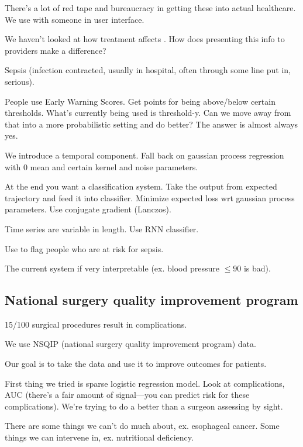 
There's a lot of red tape and bureaucracy in getting these into actual healthcare. We use with someone in user interface.

We haven't looked at how treatment affects . How does presenting this info to providers make a difference?

Sepsis (infection contracted, usually in hospital, often through some line put in, serious).

People use Early Warning Scores. Get points for being above/below certain thresholds. What's currently being used is threshold-y. Can we move away from that into a more probabilistic setting and do better? The answer is almost always yes.

We introduce a temporal component. Fall back on gaussian process regression with 0 mean and certain kernel and noise parameters.

At the end you want a classification system. Take the output from expected trajectory and feed it into classifier. Minimize expected loss wrt gaussian process parameters. 
Use conjugate gradient (Lanczos).

Time series are variable in length. Use RNN classifier.

Use to flag people who are at risk for sepsis.

The current system if very interpretable (ex. blood pressure $\le90$ is bad).

\subsection{National surgery quality improvement program}


15/100 surgical procedures result in complications.  

We use NSQIP (national surgery quality improvement program) data.

Our goal is to take the data and use it to improve outcomes for patients. 

First thing we tried is sparse logistic regression model. Look at complications, AUC (there's a fair amount of signal---you can predict risk for these complications). 
We're trying to do a better than a surgeon assessing by sight.

There are some things we can't do much about, ex. esophageal cancer. Some things we can intervene in, ex. nutritional deficiency.


